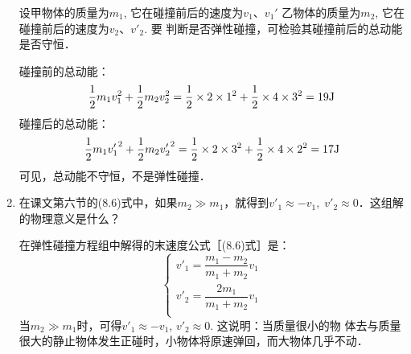 \begin{enumerate}
\begin{solution}
    设甲物体的质量为$m_1$, 它在碰撞前后的速度为$v_1$、$v_1'$
    乙物体的质量为$m_2$, 它在碰撞前后的速度为$v_2$、$v'_2$. 要
    判断是否弹性碰撞，可检验其碰撞前后的总动能是否守恒．
    
    碰撞前的总动能：
\[\frac{1}{2}m_1v_1^2+\frac{1}{2}m_2v_2^2=\frac{1}{2}\times 2\times 1^2+\frac{1}{2}\times 4\times 3^2=19{\rm J}\]
碰撞后的总动能：
\[\frac{1}{2}m_1{v'_1}^2+\frac{1}{2}m_2{v'_2}^2=\frac{1}{2}\times 2\times 3^2+\frac{1}{2}\times 4\times 2^2=17{\rm J}\]
可见，总动能不守恒，不是弹性碰撞．
\end{solution}
\item 在课文第六节的(8.6)式中，如果$m_2\gg m_1$，就得到$v'_1\approx -v_1,\; v'_2\approx 0$．这组解的物理意义是什么？


\begin{solution}
    在弹性碰撞方程组中解得的末速度公式［(8.6)式］是：
    \[\begin{cases}
        v'_1=\dfrac{m_1-m_2}{m_1+m_2}v_1\\
        v'_2=\dfrac{2m_1}{m_1+m_2}v_1\\
        \end{cases}\]
当$m_2\gg m_1$时，可得$v'_1\approx -v_1$, $v'_2\approx 0$. 这说明：当质量很小的物
体去与质量很大的静止物体发生正碰时，小物体将原速弹回，而大物体几乎不动．
\end{solution}
\end{enumerate}



